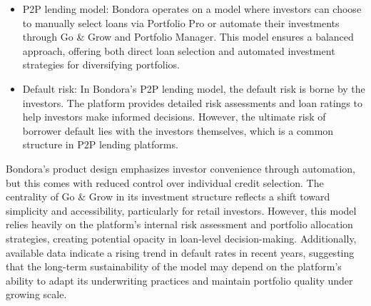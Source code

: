 \documentclass[pdflatex,sn-apa]{sn-jnl}%
\theoremstyle{thmstyleone}%
\theoremstyle{thmstyletwo}%
\theoremstyle{thmstylethree}%
\begin{document}
\begin{itemize}
        \item P2P lending model: Bondora operates on a model where investors can choose to manually select loans via Portfolio Pro or automate their investments through Go \& Grow and Portfolio Manager. This model ensures a balanced approach, offering both direct loan selection and automated investment strategies for diversifying portfolios.
        
        \item Default risk: In Bondora’s P2P lending model, the default risk is borne by the investors. The platform provides detailed risk assessments and loan ratings to help investors make informed decisions. However, the ultimate risk of borrower default lies with the investors themselves, which is a common structure in P2P lending platforms.
    \end{itemize}

Bondora’s product design emphasizes investor convenience through automation, but this comes with reduced control over individual credit selection. The centrality of Go \& Grow in its investment structure reflects a shift toward simplicity and accessibility, particularly for retail investors. However, this model relies heavily on the platform’s internal risk assessment and portfolio allocation strategies, creating potential opacity in loan-level decision-making. Additionally, available data indicate a rising trend in default rates in recent years, suggesting that the long-term sustainability of the model may depend on the platform’s ability to adapt its underwriting practices and maintain portfolio quality under growing scale.
\end{document}
